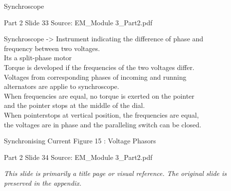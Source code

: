 \documentclass[11pt,a4paper]{article}
\begin{document}
\begin{mdframed}[roundcorner=9pt,backgroundcolor=white,linecolor=anthBlue,linewidth=1pt,innerleftmargin=12pt,innerrightmargin=12pt,innertopmargin=10pt,innerbottommargin=10pt,skipabove=8pt,skipbelow=10pt]
{\HeadingFont\fontsize{15}{18}\selectfont\color{anthDark}Synchroscope\par}
{\color{anthMid}\small Part 2 \textbullet{} Slide 33 \textbullet{} Source: EM\_Module 3\_Part2.pdf\par}
\vspace{0.5em}
{\small
Synchroscope -> Instrument indicating the difference of phase and\\
frequency between two voltages.\\
Its a split-phase motor\\
Torque is developed if the frequencies of the two voltages differ.\\
Voltages from corresponding phases of incoming and running\\
alternators are applie to synchroscope.\\
When frequencies are equal, no torque is exerted on the pointer\\
and the pointer stops at the middle of the dial.\\
When pointerstops at vertical position, the frequencies are equal,\\
the voltages are in phase and the paralleling switch can be closed.\\

}
\end{mdframed}

\begin{mdframed}[roundcorner=9pt,backgroundcolor=white,linecolor=anthGreen,linewidth=1pt,innerleftmargin=12pt,innerrightmargin=12pt,innertopmargin=10pt,innerbottommargin=10pt,skipabove=8pt,skipbelow=10pt]
{\HeadingFont\fontsize{15}{18}\selectfont\color{anthDark}Synchronising Current Figure 15 : Voltage Phasors\par}
{\color{anthMid}\small Part 2 \textbullet{} Slide 34 \textbullet{} Source: EM\_Module 3\_Part2.pdf\par}
\vspace{0.5em}
{\small
\textit{This slide is primarily a title page or visual reference. The original slide is preserved in the appendix.}

}
\end{mdframed}
\end{document}
